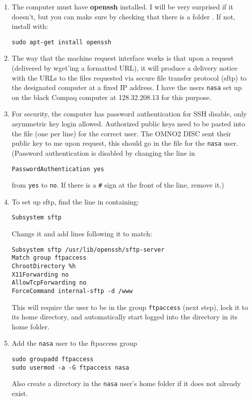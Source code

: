 \documentclass[12pt]{article}
\begin{document}
	\begin{enumerate}
	\item The computer must have \textbf{openssh} installed. I will be very surprised if it doesn't, but you can make sure by checking that there is a folder . If not, install with:
	\begin{lstlisting}
sudo apt-get install openssh
	\end{lstlisting}
	
	\item The way that the machine request interface works is that upon a request (delivered by wget'ing a formatted URL), it will produce a delivery notice with the URLs to the files requested via secure file transfer protocol (sftp) to the designated computer at a fixed IP address.  I have the users \lstinline$nasa$ set up on the black Compaq computer at 128.32.208.13 for this purpose. 
	
	\item For security, the computer has password authentication for SSH disable, only asymmetric key login allowed. Authorized public keys need to be pasted into the  file (one per line) for the correct user. The OMNO2 DISC sent their public key to me upon request, this should go in the  file for the \lstinline$nasa$ user. (Password authentication is disabled by changing the line in 
	\begin{lstlisting}
PasswordAuthentication yes
	\end{lstlisting}
	from \lstinline$yes$ to \lstinline$no$. If there is a \lstinline$#$ sign at the front of the line, remove it.)
	
	\item To set up sftp, find the line in  containing:
	\begin{lstlisting}
Subsystem sftp
	\end{lstlisting}
	Change it and add lines following it to match:
	\begin{lstlisting}
Subsystem sftp /usr/lib/openssh/sftp-server
Match group ftpaccess
ChrootDirectory %h
X11Forwarding no
AllowTcpForwarding no
ForceCommand internal-sftp -d /www
	\end{lstlisting}
	
	This will require the user to be in the group \lstinline$ftpaccess$ (next step), lock it to its home directory, and automatically start logged into the  directory in its home folder.
	
	\item Add the \lstinline$nasa$ user to the ftpaccess group
	\begin{lstlisting}
sudo groupadd ftpaccess
sudo usermod -a -G ftpaccess nasa
	\end{lstlisting}
	Also create a 	 directory in the \lstinline$nasa$ user's home folder if it does not already exist.	
	
	\end{enumerate}
\end{document}

